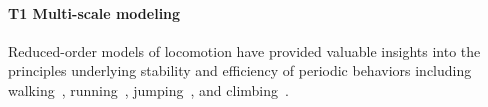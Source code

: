 \documentclass[11pt]{article}
\begin{document}
\paragraph{T1 Multi-scale modeling} 
Reduced-order models of locomotion have provided valuable insights into the principles underlying stability and efficiency of periodic behaviors including walking~, running~, %
jumping~, %
and climbing~.
\end{document}
